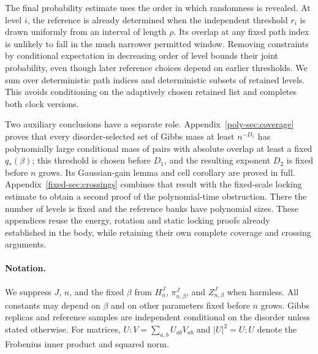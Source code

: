 The final probability estimate uses the order in which randomness is
revealed. At level $i$, the reference is already determined when the
independent threshold $r_i$ is drawn uniformly from an interval of
length $\rho$. Its overlap at any fixed path index is unlikely to fall
in the much narrower permitted window. Removing constraints by
conditional expectation in decreasing order of level bounds their
joint probability, even though later reference choices depend on
earlier thresholds. We sum over deterministic path indices and
deterministic subsets of retained levels. This avoids conditioning on
the adaptively chosen retained list and completes both clock versions.

Two auxiliary conclusions have a separate role. Appendix~\ref{poly-sec:coverage}
proves that every disorder-selected set of Gibbs mass at least
$n^{-D_1}$ has polynomially large conditional mass of pairs with
absolute overlap at least a fixed $q_*(\beta)$; this threshold is
chosen before $D_1$, and the resulting exponent $D_2$ is fixed before
$n$ grows. Its Gaussian-gain lemma and cell corollary are proved in
full. Appendix~\ref{fixed-sec:crossings} combines that result with the
fixed-scale locking estimate to obtain a second proof of the
polynomial-time obstruction. There the number of levels is fixed and
the reference banks have polynomial sizes. These appendices reuse the
energy, rotation and static locking proofs already established in the
body, while retaining their own complete coverage and crossing arguments.

\paragraph{Notation.}
We suppress $J$, $n$, and the fixed $\beta$ from $H_n^J$, $\pi_{n,\beta}^J$,
and $Z_{n,\beta}^J$ when harmless. All constants may depend on $\beta$
and on other parameters fixed before $n$ grows. Gibbs replicas and
reference samples are independent conditional on the disorder unless
stated otherwise. For matrices, $U:V=\sum_{a,b}U_{ab}V_{ab}$ and
$|U|^2=U:U$ denote the Frobenius inner product and squared norm.

